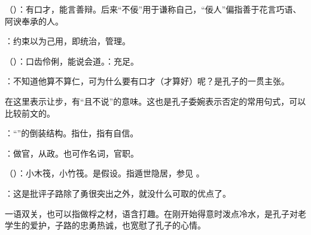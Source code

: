 {
\item {}（）：有口才，能言善辩。后来“不佞”用于谦称自己，“佞人”偏指善于花言巧语、阿谀奉承的人。
\item {}：约束以为己用，即统治，管理。
\item {}（）：口齿伶俐，能说会道。：充足。
\item {}：不知道他算不算仁，可为什么要有口才（才算好）呢？是孔子的一贯主张。

在这里表示让步，有“且不说”的意味。这也是孔子委婉表示否定的常用句式，可以比较前文的。
}
{}


{
\item {}：“”的倒装结构。指仕，指有自信。

\item {}：做官，从政。也可作名词，官职。
}
{}


{
\item {}（）：小木筏，小竹筏。是假设。指遁世隐居，参见 。
\item {}：这是批评子路除了勇很突出之外，就没什么可取的优点了。

一语双关，也可以指做桴之材，语含打趣。在刚开始得意时泼点冷水，是孔子对老学生的爱护，子路的忠勇热诚，也宽慰了孔子的心情。
}
{}


